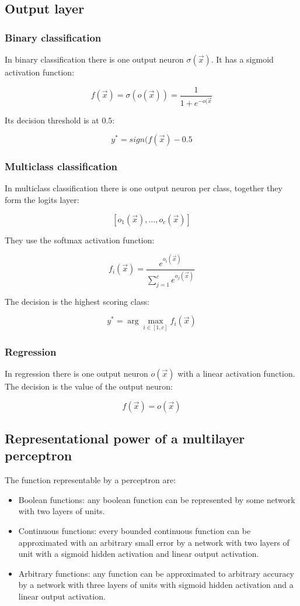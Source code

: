 	\subsection{Output layer}

		\subsubsection{Binary classification}
		In binary classification there is one output neuron $\sigma(\vec{x})$.
		It has a sigmoid activation function:

		$$f(\vec{x}) = \sigma(o(\vec{x})) = \frac{1}{1+e^{-o(\vec{x}}}$$

		Its decision threshold is at $0.5$:

		$$y^* = sign(f(\vec{x}) - 0.5$$

		\subsubsection{Multiclass classification}
		In multiclass classification there is one output neuron per class, together they form the logits layer:

		$$[o_1(\vec{x}),\dots, o_c(\vec{x})]$$

		They use the softmax activation function:

		$$f_i(\vec{x}) = \frac{e^{o_i(\vec{x})}}{\sum\limits_{j=1}^ce^{o_j(\vec{x})}}$$

		The decision is the highest scoring class:

		$$y^* = \arg\max\limits_{i\in[1,c]}f_i(\vec{x})$$

		\subsubsection{Regression}
		In regression there is one output neuron $o(\vec{x})$ with a linear activation function.
		The decision is the value of the output neuron:

		$$f(\vec{x}) = o(\vec{x})$$

	\subsection{Representational power of a multilayer perceptron}
	The function representable by a perceptron are:

	\begin{multicols}{2}
		\begin{itemize}
			\item Boolean functions: any boolean function can be represented by some network with two layers of units.
			\item Continuous functions: every bounded continuous function can be approximated with an arbitrary small error by a network with two layers of unit with a sigmoid hidden activation and linear output activation.

			\item Arbitrary functions: any function can be approximated to arbitrary accuracy by a network with three layers of units with sigmoid hidden activation and a linear output activation.
		\end{itemize}
	\end{multicols}

